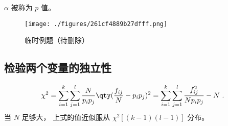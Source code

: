 $\alpha$ 被称为 $p$ 值。

\begin{figure}[ht]
\centering
\texttt{[image: ./figures/261cf4889b27dfff.png]}
\caption{临时例题（待删除）} \label{fig_Chi2_2}
\end{figure}

\subsection{检验两个变量的独立性}
\begin{equation}
\chi^2 = \sum_{i=1}^{k} \sum_{j=1}^{l} \frac{N}{p_ip_j} \qty(\frac{f_{ij}}{N} - p_ip_j)^2 = \sum_{i=1}^{k} \sum_{j=1}^{l} \frac{f_{ij}^2}{Np_ip_j} - N~.
\end{equation}
当 $N$ 足够大， 上式的值近似服从 $\chi^2[(k-1)(l-1)]$ 分布。
